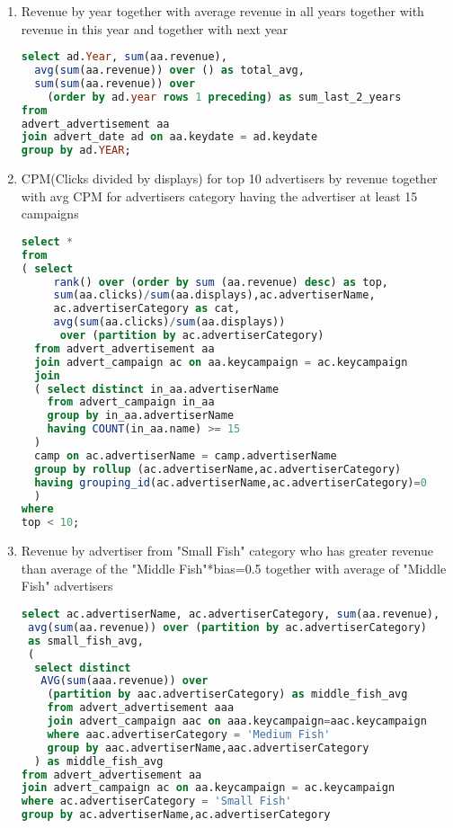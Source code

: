 \begin{enumerate}
\item    Revenue by year together with average revenue in all years together with revenue in this year and together with next year
\begin{lstlisting}[language=sql] 
select ad.Year, sum(aa.revenue), 
  avg(sum(aa.revenue)) over () as total_avg,
  sum(sum(aa.revenue)) over 
    (order by ad.year rows 1 preceding) as sum_last_2_years
from   
advert_advertisement aa
join advert_date ad on aa.keydate = ad.keydate
group by ad.YEAR;
  \end{lstlisting}
\item    CPM(Clicks divided by displays) for top 10 advertisers by revenue together with avg CPM for advertisers category having the advertiser at least 15 campaigns
  \begin{lstlisting}[language=sql] 
select *
from 
( select
     rank() over (order by sum (aa.revenue) desc) as top,
     sum(aa.clicks)/sum(aa.displays),ac.advertiserName,
     ac.advertiserCategory as cat, 
     avg(sum(aa.clicks)/sum(aa.displays)) 
      over (partition by ac.advertiserCategory)
  from advert_advertisement aa
  join advert_campaign ac on aa.keycampaign = ac.keycampaign
  join
  ( select distinct in_aa.advertiserName 
    from advert_campaign in_aa
    group by in_aa.advertiserName
    having COUNT(in_aa.name) >= 15
  )
  camp on ac.advertiserName = camp.advertiserName
  group by rollup (ac.advertiserName,ac.advertiserCategory) 
  having grouping_id(ac.advertiserName,ac.advertiserCategory)=0
  )
where 
top < 10;
\end{lstlisting}
\item Revenue by advertiser from "Small Fish" category who has greater revenue than average of the "Middle Fish"*bias=0.5 together with average of "Middle Fish" advertisers  
  \begin{lstlisting}[language=sql] 
select ac.advertiserName, ac.advertiserCategory, sum(aa.revenue), 
 avg(sum(aa.revenue)) over (partition by ac.advertiserCategory) 
 as small_fish_avg,
 ( 
  select distinct
   AVG(sum(aaa.revenue)) over 
    (partition by aac.advertiserCategory) as middle_fish_avg
    from advert_advertisement aaa 
    join advert_campaign aac on aaa.keycampaign=aac.keycampaign
    where aac.advertiserCategory = 'Medium Fish'   
    group by aac.advertiserName,aac.advertiserCategory
  ) as middle_fish_avg
from advert_advertisement aa
join advert_campaign ac on aa.keycampaign = ac.keycampaign
where ac.advertiserCategory = 'Small Fish'
group by ac.advertiserName,ac.advertiserCategory

\end{lstlisting}
\end{enumerate}
